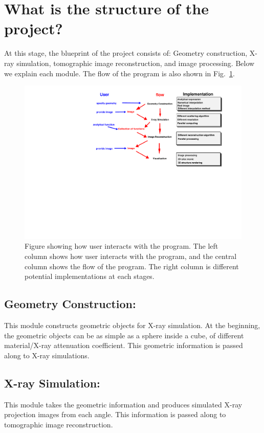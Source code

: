 \documentclass[11]{article}
\begin{document}
\section{What is the structure of the project?}
At this stage, the blueprint of the project consists of: Geometry construction, X-ray simulation, tomographic image reconstruction, and image processing. Below we explain each module. The flow of the program is also shown in Fig.~\ref{program_flow}.
	\begin{figure}
	\includegraphics[scale=0.7]{flow}
	\centering
	\caption{Figure showing how user interacts with the program. The left column shows how user interacts with the program, and the central column shows the flow of the program. The right column is different potential implementations at each stages.}
	\label{program_flow}
	\end{figure}
	\subsection{Geometry Construction:}
		This module constructs geometric objects for X-ray simulation. At the beginning, the geometric objects can be as simple as a sphere inside a cube, of different material/X-ray attenuation coefficient. This geometric information is passed along to X-ray simulations.

	\subsection{X-ray Simulation:}
		This module takes the geometric information and produces simulated X-ray projection images from each angle. This information is passed along to tomographic image reconstruction.
\end{document}
